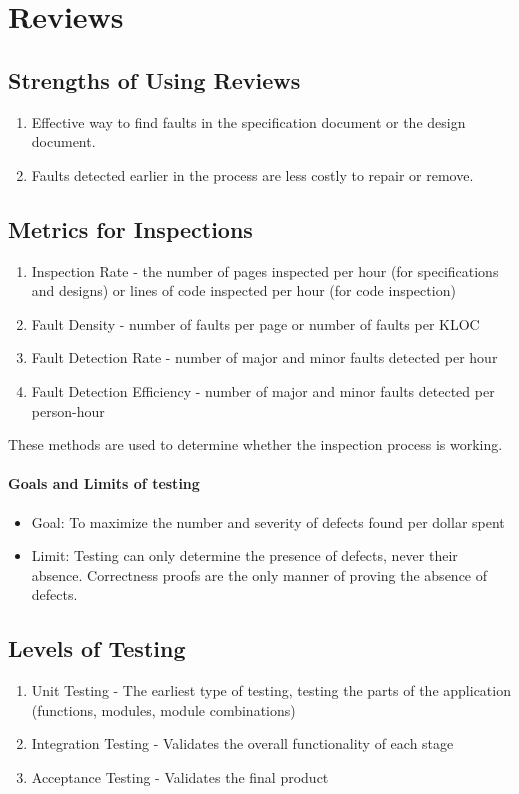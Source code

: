 \documentclass{report}
\begin{document}
		\section{Reviews}
			\subsection{Strengths of Using Reviews}
				\begin{enumerate}
					\item Effective way to find faults in the specification document or the design document.
					\item Faults detected earlier in the process are less costly to repair or remove.
				\end{enumerate}
			\subsection{Metrics for Inspections}
				\begin{enumerate}
					\item Inspection Rate - the number of pages inspected per hour (for specifications and designs) or lines of code inspected per hour (for code inspection)
					\item Fault Density - number of faults per page or number of faults per KLOC
					\item Fault Detection Rate - number of major and minor faults detected per hour
					\item Fault Detection Efficiency - number of major and minor faults detected per person-hour
				\end{enumerate}
				These methods are used to determine whether the inspection process is working.
			\paragraph{Goals and Limits of testing}
				\begin{itemize}
					\item Goal: To maximize the number and severity of defects found per dollar spent
					\item Limit: Testing can only determine the presence of defects, never their absence. Correctness proofs are the only manner of proving the absence of defects.
				\end{itemize}
			\subsection{Levels of Testing}
				\begin{enumerate}
					\item Unit Testing - The earliest type of testing, testing the parts of the application (functions, modules, module combinations)
					\item Integration Testing - Validates the overall functionality of each stage
					\item Acceptance Testing - Validates the final product
				\end{enumerate}
\end{document}
